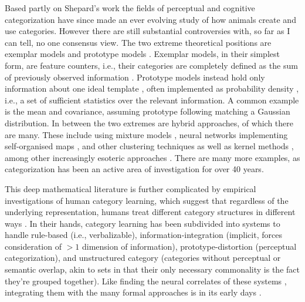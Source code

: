 \documentclass[doc,12pt]{apa}        %
\begin{document}
Based partly on Shepard's work the fields of perceptual and cognitive categorization have since made an ever evolving study of how animals create and use categories.  However there are still substantial controversies with, so far as I can tell, no one consensus view.  The two extreme theoretical positions are exemplar models and prototype models \cite{Ashby:2005p4764}.  Exemplar models, in their simplest form, are feature counters, i.e., their categories are completely defined as the sum of previously observed information \cite{Nosofsky:1988p9104}.  Prototype models instead hold only information about one ideal template \cite{Rosch:1973p9108}, often implemented as probability density \cite{Ashby:1995p9109}, i.e., a set of sufficient statistics over the relevant information.  A common example is the mean and covariance, assuming prototype following matching a Gaussian distribution.  In between the two extremes are hybrid approaches, of which there are many.  These include using mixture models \cite{Rossee:2002p9112}, neural networks implementing self-organised maps \cite{Love:2004p9110}, and other clustering techniques \cite{Kruschke:2012p9111} as well as kernel methods \cite{Jakel:2008p9113}, among other increasingly esoteric approaches \cite{Martin:2012p9185}. There are many more examples, as categorization has been an active area of investigation for over 40 years.

This deep mathematical literature is further complicated by empirical investigations of human category learning, which suggest that regardless of the underlying representation, humans treat different category structures in different ways \cite{Ashby:2011p9148}.  In their hands, category learning has been subdivided into systems to handle rule-based (i.e., verbalizable), information-integration (implicit, forces consideration of $>1$ dimension of information), prototype-distortion (perceptual categorization), and unstructured category (categories without perceptual or semantic overlap, akin to sets in that their only necessary commonality is the fact they're grouped together).  Like finding the neural correlates of these systems \cite{Ashby:2005p9152,Ashby:2006p9153}, integrating them with the many formal approaches is in its early days \cite{Ashby:2011p9148}.

\end{document}
